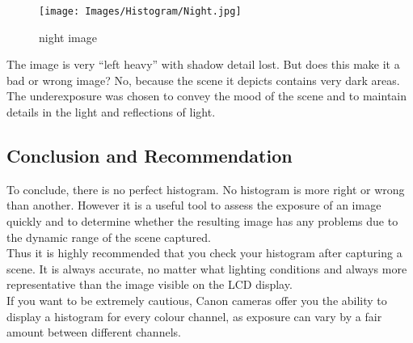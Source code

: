 \begin{figure}
	\centering
		\texttt{[image: Images/Histogram/Night.jpg]}
	\caption{night image}
	\label{fig:Night}
\end{figure}

The image is very ``left heavy'' with shadow detail lost. But does this make it a bad or wrong image? No, because the scene it depicts contains very dark areas. The underexposure was chosen to convey the mood of the scene and to maintain details in the light and reflections of light.

\subsection{Conclusion and Recommendation}

To conclude, there is no perfect histogram. No histogram is more right or wrong than another. However it is a useful tool to assess the exposure of an image quickly and to determine whether the resulting image has any problems due to the dynamic range of the scene captured.
\\[\baselineskip]
Thus it is highly recommended that you check your histogram after capturing a scene. It is always accurate, no matter what lighting conditions and always more representative than the image visible on the LCD display.
\\
If you want to be extremely cautious, Canon cameras offer you the ability to display a histogram for every colour channel, as exposure can vary by a fair amount between different channels.
